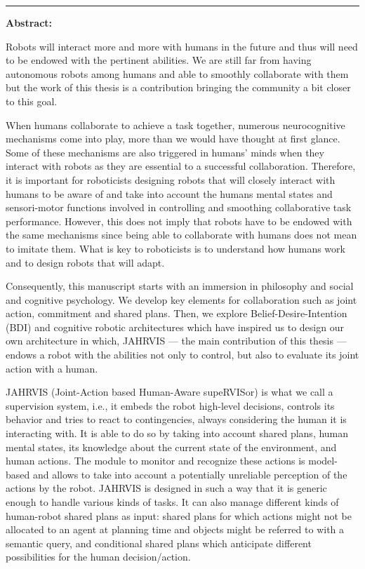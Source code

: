 \documentclass[english,a4paper,11pt,twoside]{StyleThese}
\begin{document}
\cleardoublepage
\begin{vcenterpage}
\noindent\rule[2pt]{\textwidth}{0.5pt}

\textbf{Abstract:}

Robots will interact more and more with humans in the future and thus will need to be endowed with the pertinent abilities. We are still far from having autonomous robots among humans and able to smoothly collaborate with them but the work of this thesis is a contribution bringing the community a bit closer to this goal. 


When humans collaborate to achieve a task together, numerous neurocognitive mechanisms come into play, more than we would have thought at first glance. Some of these mechanisms are also triggered in humans’ minds when they interact with robots as they are essential to a successful collaboration. Therefore, it is important for roboticists designing robots that will closely interact with humans to be aware of and take into account the humans mental states and sensori-motor functions involved in controlling and smoothing collaborative task performance. However, this does not imply that robots have to be endowed with the same mechanisms since being able to collaborate with humans does not mean to imitate them. What is key to roboticists is to understand how humans work and to design  robots that will adapt. 


Consequently, this manuscript starts with an immersion in philosophy and social and cognitive psychology. We develop key elements for collaboration such as joint action, commitment and shared plans. Then, we explore Belief-Desire-Intention (BDI) and cognitive robotic architectures  which have inspired us to design our own architecture in which, JAHRVIS —  the main contribution of this thesis — endows a robot with the abilities not only to control, but also to evaluate its joint action with a human. 


JAHRVIS (Joint-Action based Human-Aware supeRVISor) is what we call a supervision system, i.e., it embeds the robot high-level decisions, controls its behavior and tries to react to contingencies, always considering the human it is interacting with. It is able to do so by taking into account shared plans, human mental states, its knowledge about the current state of the environment, and human actions. The module to monitor and recognize these actions is model-based and allows to take into account a potentially unreliable perception of the actions by the robot. JAHRVIS is designed in such a way that it is generic enough to handle various kinds of tasks. It can also manage  different kinds of human-robot shared plans as input: shared plans for which actions might not be allocated to an agent at planning time and objects might be referred to with a semantic query, and conditional shared plans which anticipate different possibilities for the human decision/action. 



\end{vcenterpage}
\end{document}
